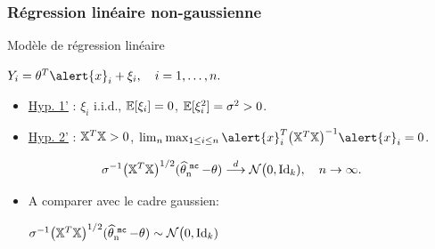\begin{frame}
\frametitle{Régression linéaire non-gaussienne} Modèle de
régression linéaire \vspace{3mm} \centerline{$ Y_i= \truetheta^T
\alert{x}_i+\xi_i, \quad i=1,\dots,n.$}

\vspace{-2mm}

\begin{itemize}
\item \underline{Hyp. 1'} : \alert{$\xi_i$ i.i.d., $\operatorname{{\mathbb E}}[\xi_i]
=0$, $\operatorname{{\mathbb E}}[\xi_i^2] = \sigma^2>0$.}
\item \underline{Hyp. 2'} : $\mathbb{X}^T \mathbb{X}>0$, \alert{$\lim_n\max_{1\le i \le n}\alert{x}_i^T
\big(\regressmat^T \regressmat\big)^{-1}\alert{x}_i =0$.}
\end{itemize}
\begin{prop}
$$
\sigma^{-1}\big(\mathbb{X}^T
\mathbb{X}\big)^{1/2}(\operatorname{\widehat \theta_n^{\,\,{\tt mc}}}-\theta)\stackrel{d}{\longrightarrow}
{\mathcal N}\big(0, \mathrm{Id}_k), \quad n\to\infty.
$$
\end{prop}
\begin{itemize}
\item A comparer avec le cadre gaussien:\vspace{2mm}
\centerline{$\sigma^{-1}\big(\mathbb{X}^T
\mathbb{X}\big)^{1/2}(\operatorname{\widehat \theta_n^{\,\,{\tt mc}}}-\theta)\sim {\mathcal N}\big(0,
\mathrm{Id}_k)$ }
\end{itemize}
\end{frame}


